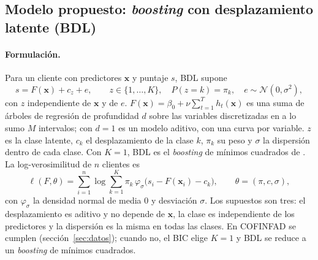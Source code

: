 

\subsection{Modelo propuesto: \emph{boosting} con desplazamiento latente (BDL)}\label{sec:modelo}

\paragraph{Formulación.}
Para un cliente con predictores $\bm{x}$ y puntaje $s$, BDL supone
\begin{equation}
  s = F(\bm{x}) + c_{z} + e, \qquad z \in \{1, \dots, K\}, \quad P(z = k) = \pi_k, \quad e \sim \mathcal{N}(0, \sigma^2),
  \label{eq:modelo}
\end{equation}
con $z$ independiente de $\bm{x}$ y de $e$. $F(\bm{x}) = \beta_0 + \nu \sum_{t=1}^{T} h_t(\bm{x})$ es una suma de árboles
de regresión de profundidad $d$ sobre las variables discretizadas en a lo sumo $M$ intervalos; con $d = 1$ es un modelo
aditivo, con una curva por variable. $z$ es la clase latente, $c_k$ el desplazamiento de la clase $k$, $\pi_k$ su peso y
$\sigma$ la dispersión dentro de cada clase. Con $K = 1$, BDL es el \emph{boosting} de mínimos cuadrados de
\citet{friedman2001}. La log-verosimilitud de $n$ clientes es
\begin{equation}
  \ell(F, \theta) = \sum_{i=1}^{n} \log \sum_{k=1}^{K} \pi_k\, \varphi_\sigma\big(s_i - F(\bm{x}_i) - c_k\big),
  \qquad \theta = (\pi, c, \sigma),
  \label{eq:vero}
\end{equation}
con $\varphi_\sigma$ la densidad normal de media $0$ y desviación $\sigma$. Los supuestos son tres: el desplazamiento es
aditivo y no depende de $\bm{x}$, la clase es independiente de los predictores y la dispersión es la misma en todas las
clases. En COFINFAD se cumplen (sección~\ref{sec:datos}); cuando no, el BIC elige $K = 1$ y BDL se reduce a un
\emph{boosting} de mínimos cuadrados.

